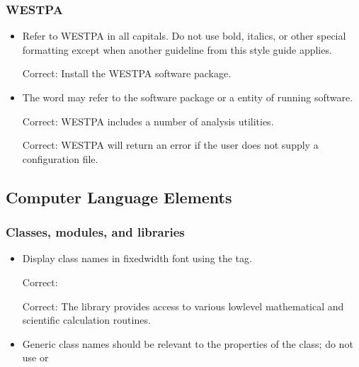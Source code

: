 \documentclass[letterpaper,10pt,english]{sphinxmanual}
\begin{document}
\subsubsection{WESTPA}
\label{\detokenize{development/style_guide:westpa}}\begin{itemize}
\item {} 
Refer to WESTPA in all capitals. Do not use bold, italics, or other special
formatting except when another guideline from this style guide applies.

Correct: Install the WESTPA software package.

\item {} 
The word  may refer to the software package or a entity of running
software.

Correct: WESTPA includes a number of analysis utilities.

Correct: WESTPA will return an error if the user does not supply a
configuration file.

\end{itemize}


\subsection{Computer Language Elements}
\label{\detokenize{development/style_guide:computer-language-elements}}

\subsubsection{Classes, modules, and libraries}
\label{\detokenize{development/style_guide:classes-modules-and-libraries}}\begin{itemize}
\item {} 
Display class names in fixed\sphinxhyphen{}width font using the \sphinxcode{\sphinxupquote{\textasciigrave{}\textasciigrave{}}} tag.

Correct: 

Correct: The  library provides access to various low\sphinxhyphen{}level
mathematical and scientific calculation routines.

\item {} 
Generic class names should be relevant to the properties of the class; do not
use  or 
\begin{quote}

\end{quote}

\end{itemize}
\end{document}
